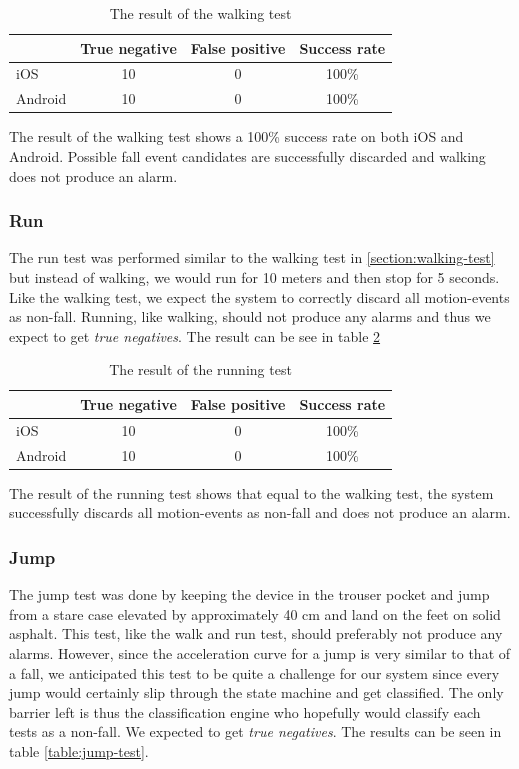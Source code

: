 \documentclass[12pt, a4paper, onecolumn]{article}
\begin{document}
	\begin{table}[H]
		\centering
		\begin{tabular}{|l|c|c|c|}
			\hline
			& True negative & False positive & Success rate \\ \hline
			iOS     & 10            & 0              & 100\%        \\ \hline
			Android & 10            & 0              & 100\%        \\ \hline
		\end{tabular}
		\caption{The result of the walking test}
		\label{table:walk-test}
	\end{table}
	
	The result of the walking test shows a 100\% success rate on both iOS and Android. Possible fall event candidates are successfully discarded and walking does not produce an alarm.
	
	
	\subsubsection{Run}
	The run test was performed similar to the walking test in \ref{section:walking-test} but instead of walking, we would run for 10 meters and then stop for 5 seconds. Like the walking test, we expect the system to correctly discard all motion-events as non-fall. Running, like walking, should not produce any alarms and thus we expect to get \textit{true negatives}. The result can be see in table \ref{table:run-test}
	
	
	\begin{table}[H]
		\centering
		\begin{tabular}{|l|c|c|c|}
			\hline
			& True negative & False positive & Success rate \\ \hline
			iOS     & 10            & 0              & 100\%        \\ \hline
			Android & 10            & 0              & 100\%        \\ \hline
		\end{tabular}
		\caption{The result of the running test}
		\label{table:run-test}
	\end{table}
	
	The result of the running test shows that equal to the walking test, the system successfully discards all motion-events as non-fall and does not produce an alarm.
	
	
	\subsubsection{Jump}
	The jump test was done by keeping the device in the trouser pocket and jump from a stare case elevated by approximately 40 cm and land on the feet on solid asphalt. This test, like the walk and run test, should preferably not produce any alarms. However, since the acceleration curve for a jump is very similar to that of a fall, we anticipated this test to be quite a challenge for our system since every jump would certainly slip through the state machine and get classified. The only barrier left is thus the classification engine who hopefully would classify each tests as a non-fall. We expected to get \textit{true negatives}. The results can be seen in table \ref{table:jump-test}.
	
\end{document}
